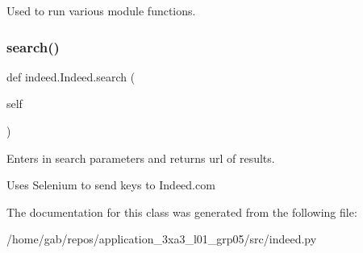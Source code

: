 Used to run various module functions. 

\mbox{\label{classindeed_1_1Indeed_a21ada3714f73ea0dc98c2ff0099ee286}} 
\subsubsection{\texorpdfstring{search()}{search()}}
{\footnotesize\ttfamily def indeed.\+Indeed.\+search (\begin{DoxyParamCaption}\item[{}]{self }\end{DoxyParamCaption})}



Enters in search parameters and returns url of results. 

Uses Selenium to send keys to Indeed.\+com 

The documentation for this class was generated from the following file\+:\begin{DoxyCompactItemize}
\item 
/home/gab/repos/application\+\_\+3xa3\+\_\+l01\+\_\+grp05/src/indeed.\+py\end{DoxyCompactItemize}
